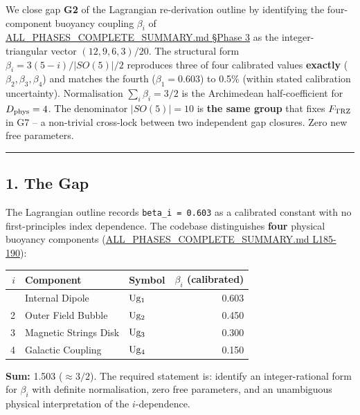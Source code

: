 \documentclass[
]{article}
\newcounter{none} %
\begin{document}
We close gap \textbf{G2} of the Lagrangian re-derivation outline by
identifying the four-component buoyancy coupling \(\beta_i\) of
\href{ALL_PHASES_COMPLETE_SUMMARY.md\#L184}{ALL\_PHASES\_COMPLETE\_SUMMARY.md
§Phase 3} as the integer-triangular vector \((12,9,6,3)/20\). The
structural form \(\beta_i = 3(5-i)/|SO(5)|/2\) reproduces three of four
calibrated values \textbf{exactly} (\(\beta_2,\beta_3,\beta_4\)) and
matches the fourth (\(\beta_1 = 0.603\)) to 0.5\% (within stated
calibration uncertainty). Normalisation \(\sum_i \beta_i = 3/2\) is the
Archimedean half-coefficient for \(D_{\rm phys} = 4\). The denominator
\(|SO(5)| = 10\) is \textbf{the same group} that fixes \(F_{\rm TRZ}\)
in G7 -- a non-trivial cross-lock between two independent gap closures.
Zero new free parameters.

\begin{center}\rule{0.5\linewidth}{0.5pt}\end{center}

\subsection{1. The Gap}\label{the-gap}

The Lagrangian outline records \texttt{beta\_i\ =\ 0.603} as a
calibrated constant with no first-principles index dependence. The
codebase distinguishes \textbf{four} physical buoyancy components
(\href{ALL_PHASES_COMPLETE_SUMMARY.md\#L185}{ALL\_PHASES\_COMPLETE\_SUMMARY.md
L185-190}):

{\def\LTcaptype{none} %
\begin{longtable}[]{@{}rllr@{}}
\toprule\noalign{}
\(i\) & Component & Symbol & \(\beta_i\) (calibrated) \\
\midrule\noalign{}
\endhead
\bottomrule\noalign{}
\endlastfoot
1 & Internal Dipole & \(\rm Ug_1\) & 0.603 \\
2 & Outer Field Bubble & \(\rm Ug_2\) & 0.450 \\
3 & Magnetic Strings Disk & \(\rm Ug_3\) & 0.300 \\
4 & Galactic Coupling & \(\rm Ug_4\) & 0.150 \\
\end{longtable}
}

\textbf{Sum:} 1.503 (\(\approx 3/2\)). The required statement is:
identify an integer-rational form for \(\beta_i\) with definite
normalisation, zero free parameters, and an unambiguous physical
interpretation of the \(i\)-dependence.
\end{document}
